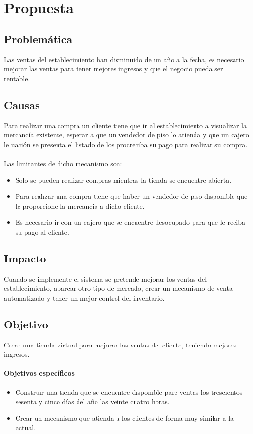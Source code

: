\chapter{Propuesta}
	\section{Problemática}
	Las ventas del establecimiento han disminuido de un año a la fecha, es necesario mejorar las ventas para tener mejores ingresos y que el negocio pueda ser rentable.
	\\ 
	\section{Causas}
	Para realizar una compra un cliente tiene que ir al establecimiento a visualizar la mercancía existente, esperar a que un vendedor de piso lo atienda y que un cajero le uaci\'on se presenta el listado de los procreciba su pago para realizar su compra.\\ \\
	 Las limitantes de dicho mecanismo son:
	 \begin{itemize}
	 	\item Solo se pueden realizar compras mientras la tienda se encuentre abierta.
	 	\item Para realizar una compra tiene que haber un vendedor de piso disponible que le proporcione la mercancia a dicho cliente.
	 	\item Es necesario ir con un cajero que se encuentre desocupado para que le reciba su pago al cliente.
	 \end{itemize}
	
	\section{Impacto}
	Cuando se implemente el sistema se pretende mejorar los ventas del establecimiento, abarcar otro tipo de mercado, crear un mecanismo de venta automatizado y tener un mejor control del inventario.
	
	\newpage
	\section{Objetivo}
		Crear una tienda virtual para mejorar las ventas del cliente, teniendo mejores ingresos.
		\subsubsection{Objetivos específicos}
			\begin{itemize}
				\item Construir una tienda que se encuentre disponible pare ventas los trescientos sesenta y cinco días del a\~no las veinte cuatro horas.
				\item Crear un mecanismo que atienda a los clientes de forma muy similar a la actual.
			\end{itemize}
	
